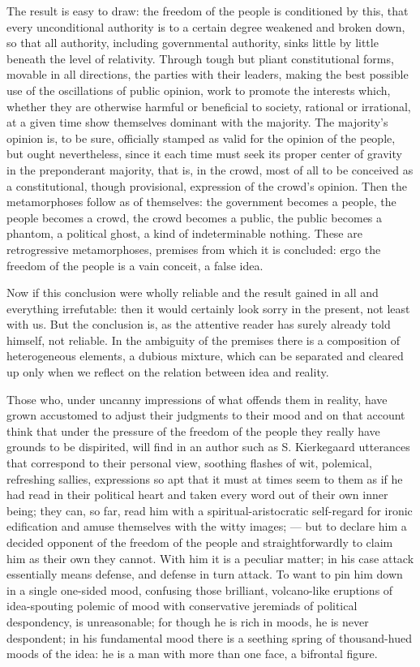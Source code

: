 \documentclass[12pt,a4paper,openany]{book}
\newcommand{\opage}[1]{\marginnote{\footnotesize\textit{[#1]}}}
\begin{document}
The result is easy to draw: the freedom of the people is conditioned
by this, that every unconditional authority is to a certain degree weakened
and broken down, so that all authority, including governmental authority,
sinks little by little beneath the level of relativity.
Through tough but pliant constitutional forms, movable in all
directions, the parties with their leaders, making the best possible use of the oscillations
of public opinion, work to promote the interests
which, whether they are otherwise harmful
\setcounter{footnote}{0}%
\opage{18}or beneficial to society, rational or irrational, at
a given time show themselves dominant with the majority. The majority's
opinion is, to be sure, officially stamped as valid
for the opinion of the people, but ought nevertheless, since it each
time must seek its proper center of gravity in the preponderant
majority, that is, in the crowd, most of all to be conceived
as a constitutional, though provisional, expression
of the crowd's opinion. Then the metamorphoses follow as
of themselves: the government becomes a people, the people becomes a
crowd, the crowd becomes a public, the public becomes
a phantom, a political ghost, a kind of indeterminable
nothing. These are retrogressive metamorphoses, premises
from which it is concluded: ergo the freedom of the people is a
vain conceit, a false idea.

Now if this conclusion were wholly reliable
and the result gained in all and everything irrefutable:
then it would certainly look sorry in the present, not
least with us. But the conclusion is, as the attentive
reader has surely already told himself, not reliable.
In the ambiguity of the premises there is a composition
of heterogeneous elements, a dubious
mixture, which can be separated and cleared up only when we reflect
on the relation between idea and reality.

Those who, under uncanny impressions of what
offends them in reality, have grown accustomed to adjust
their judgments to their mood and on that account
think that under the pressure of the freedom of the people they really have
grounds to be dispirited, will find in an author such as
S. Kierkegaard utterances that correspond to their personal
view, soothing flashes of wit, polemical, refreshing
sallies, expressions so apt that it must at times
\setcounter{footnote}{0}%
\opage{19}seem to them as if he had read in their political
heart and taken every word out of their own inner being; they
can, so far, read him with a spiritual-aristocratic self-regard
for ironic edification and amuse themselves with the
witty images; --- but to declare him a decided opponent
of the freedom of the people and straightforwardly to claim him as their own
they cannot. With him it is a peculiar matter; in his case
attack essentially means defense, and defense in turn attack.
To want to pin him down in a single one-sided mood,
confusing those brilliant, volcano-like eruptions
of idea-spouting polemic of mood with conservative
jeremiads of political despondency, is unreasonable; for
though he is rich in moods, he is never despondent;
in his fundamental mood there is a seething spring of thousand-hued
moods of the idea: he is a man with more than
one face, a bifrontal figure.
\end{document}
